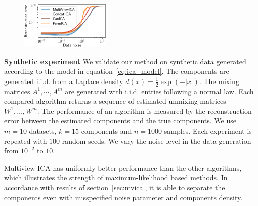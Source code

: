 \documentclass[12pt]{report}
\begin{document}
\begin{figure}
\label{fig:synth}
\includegraphics[width=0.38\textwidth]{figures/mvica/distance_expe.pdf}
\end{figure}

\textbf{Synthetic experiment}
We validate our method on synthetic data generated according to the model in equation~\eqref{eq:ica_model}.
%
The components are generated i.i.d. from a Laplace density $d(x)=\frac12\exp(-|x|)$.
%
The mixing matrices $A^1,\cdots, A^m$ are generated with i.i.d. entries following a normal law.
Each compared algorithm returns a sequence of estimated unmixing matrices $W^1, \dots, W^m$.
%
The performance of an algorithm is measured by the reconstruction error between the estimated components and the true components.
%
%
We use $m=10$ datasets, $k=15$ components and $n=1000$ samples. Each experiment is repeated with $100$ random seeds.
%
We vary the noise level in the data generation from $10^{-2}$ to $10$.

Multiview ICA has uniformly better performance than the other algorithms, which illustrates the strength of maximum-likelihood based methods. In accordance with results of section~\ref{sec:mvica}, it is able to separate the components even with misspecified noise parameter and components density.
%
\end{document}
